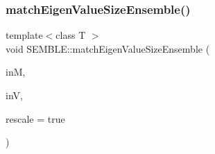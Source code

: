 \subsubsection{\texorpdfstring{matchEigenValueSizeEnsemble()}{matchEigenValueSizeEnsemble()}}
{\footnotesize\ttfamily template$<$class T $>$ \\
void S\+E\+M\+B\+L\+E\+::match\+Eigen\+Value\+Size\+Ensemble (\begin{DoxyParamCaption}\item[{\mbox{\hyperlink{structSEMBLE_1_1SembleMatrix}{Semble\+Matrix}}$<$ T $>$ \&}]{inM,  }\item[{\mbox{\hyperlink{structSEMBLE_1_1SembleVector}{Semble\+Vector}}$<$ double $>$ \&}]{inV,  }\item[{bool}]{rescale = {\ttfamily true} }\end{DoxyParamCaption})}

